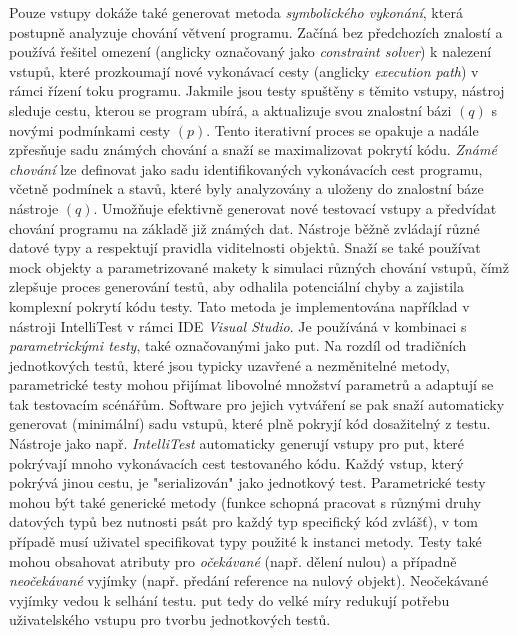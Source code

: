 \documentclass[czech, ma, kiv, he, iso690alph, pdf, viewonly]{fasthesis}
\begin{document}
        Pouze vstupy dokáže také generovat metoda \textit{symbolického vykonání}, která postupně analyzuje chování větvení programu. Začíná bez předchozích znalostí a používá řešitel omezení (anglicky označovaný jako \textit{constraint solver}) k nalezení vstupů, které prozkoumají nové vykonávací cesty (anglicky \textit{execution path}) v rámci řízení toku programu. Jakmile jsou testy spuštěny s těmito vstupy, nástroj sleduje cestu, kterou se program ubírá, a aktualizuje svou znalostní bázi \((q)\) s novými podmínkami cesty \((p)\). Tento iterativní proces se opakuje a nadále zpřesňuje sadu známých chování a snaží se maximalizovat pokrytí kódu. \textit{Známé chování} lze definovat jako sadu identifikovaných vykonávacích cest programu, včetně podmínek a stavů, které byly analyzovány a uloženy do znalostní báze nástroje \((q)\). Umožňuje efektivně generovat nové testovací vstupy a předvídat chování programu na základě již známých dat. Nástroje běžně zvládají různé datové typy a respektují pravidla viditelnosti objektů. Snaží se také používat mock objekty a parametrizované makety k simulaci různých chování vstupů, čímž zlepšuje proces generování testů, aby odhalila potenciální chyby a zajistila komplexní pokrytí kódu testy. \cite{parizek_symbolic_execution} Tato metoda je implementována například v nástroji IntelliTest v rámci IDE \textit{Visual Studio}. Je používáná v kombinaci s \emph{parametrickými testy}, také označovanými jako \acrshort{put}. Na rozdíl od tradičních jednotkových testů, které jsou typicky uzavřené a nezměnitelné metody, parametrické testy mohou přijímat libovolné množství parametrů a adaptují se tak testovacím scénářům. Software pro jejich vytváření se pak snaží automaticky generovat (minimální) sadu vstupů, které plně pokryjí kód dosažitelný z testu. Nástroje jako např. \textit{IntelliTest} automaticky generují vstupy pro \acrshort{put}, které pokrývají mnoho vykonávacích cest testovaného kódu. Každý vstup, který pokrývá jinou cestu, je "serializován" jako jednotkový test. Parametrické testy mohou být také generické metody (funkce schopná pracovat s různými druhy datových typů bez nutnosti psát pro každý typ specifický kód zvlášť), v tom případě musí uživatel specifikovat typy použité k instanci metody. Testy také mohou obsahovat atributy pro \emph{očekávané} (např. dělení nulou) a případně \emph{neočekávané} vyjímky (např. předání reference na nulový objekt). Neočekávané vyjímky vedou k selhání testu. \acrshort{put} tedy do velké míry redukují potřebu uživatelského vstupu pro tvorbu jednotkových testů. \cite{IntelliTestInputGeneration2023} \cite{microsoft2023testgen}
\end{document}
